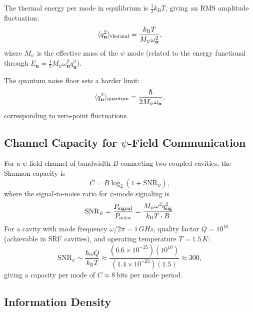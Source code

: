 \documentclass[12pt,a4paper,twoside]{article}
\newcommand{\kB}{k_{\mathrm{B}}}
\begin{document}
The thermal energy per mode in equilibrium is $\frac{1}{2}\kB T$, giving an RMS amplitude fluctuation:
\begin{equation}
\langle q_{\mathbf{n}}^2 \rangle_{\rm thermal} = \frac{\kB T}{M_\psi \omega_{\mathbf{n}}^2},
\label{eq:thermal_noise}
\end{equation}
where $M_\psi$ is the effective mass of the $\psi$ mode (related to the energy functional through $E_{\mathbf{n}} = \frac{1}{2}M_\psi \omega_{\mathbf{n}}^2 q_{\mathbf{n}}^2$).

The quantum noise floor sets a harder limit:
\begin{equation}
\langle q_{\mathbf{n}}^2 \rangle_{\rm quantum} = \frac{\hbar}{2M_\psi \omega_{\mathbf{n}}},
\label{eq:quantum_noise}
\end{equation}
corresponding to zero-point fluctuations.

\subsection{Channel Capacity for $\psi$-Field Communication}\label{sec:channel}

For a $\psi$-field channel of bandwidth $B$ connecting two coupled cavities, the Shannon capacity is
\begin{equation}
C = B \log_2\!\left(1 + \mathrm{SNR}_\psi\right),
\label{eq:shannon}
\end{equation}
where the signal-to-noise ratio for $\psi$-mode signaling is
\begin{equation}
\mathrm{SNR}_\psi = \frac{P_{\rm signal}}{P_{\rm noise}} = \frac{M_\psi \omega^2 q_{\rm sig}^2}{\kB T \cdot B}.
\label{eq:snr}
\end{equation}
For a cavity with mode frequency $\omega/2\pi = 1\,\si{GHz}$, quality factor $Q = 10^{10}$ (achievable in SRF cavities), and operating temperature $T = 1.5\,\si{K}$:
\begin{equation}
\mathrm{SNR}_\psi \sim \frac{\hbar\omega Q}{\kB T} \approx \frac{(6.6\times 10^{-25})(10^{10})}{(1.4\times 10^{-23})(1.5)} \approx 300,
\label{eq:snr_estimate}
\end{equation}
giving a capacity per mode of $C \approx 8$\,bits per mode period.

\subsection{Information Density}\label{sec:info_density}
\end{document}
